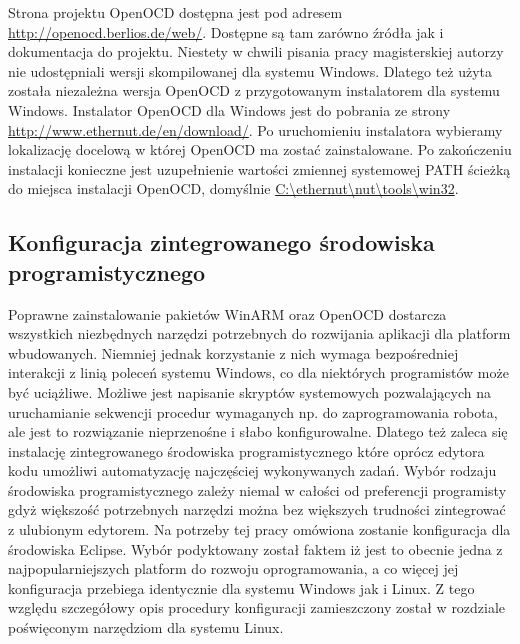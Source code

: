Strona projektu OpenOCD dostępna jest pod adresem
\url{http://openocd.berlios.de/web/}. Dostępne są tam zarówno źródła jak i
dokumentacja do projektu. Niestety w chwili pisania pracy magisterskiej autorzy
nie udostępniali wersji skompilowanej dla systemu Windows. Dlatego też użyta
została niezależna wersja OpenOCD z przygotowanym instalatorem dla systemu
Windows. Instalator OpenOCD dla Windows jest do pobrania ze strony
\url{http://www.ethernut.de/en/download/}. Po uruchomieniu instalatora wybieramy
lokalizację docelową w której OpenOCD ma zostać zainstalowane. Po zakończeniu
instalacji konieczne jest uzupełnienie wartości zmiennej systemowej PATH ścieżką
do miejsca instalacji OpenOCD, domyślnie \url{C:\ethernut\nut\tools\win32}.

\subsection{Konfiguracja zintegrowanego środowiska programistycznego}
Poprawne zainstalowanie pakietów WinARM oraz OpenOCD dostarcza wszystkich
niezbędnych narzędzi potrzebnych do rozwijania aplikacji dla platform
wbudowanych. Niemniej jednak korzystanie z nich wymaga bezpośredniej interakcji
z linią poleceń systemu Windows, co dla niektórych programistów może być
uciążliwe. Możliwe jest napisanie skryptów systemowych pozwalających na
uruchamianie sekwencji procedur wymaganych np. do zaprogramowania robota,
ale jest to rozwiązanie nieprzenośne i słabo konfigurowalne. Dlatego też zaleca
się instalację zintegrowanego środowiska programistycznego które oprócz edytora
kodu umożliwi automatyzację najczęściej wykonywanych zadań. Wybór rodzaju
środowiska programistycznego zależy niemal w całości od preferencji programisty
gdyż większość potrzebnych narzędzi można bez większych trudności zintegrować z
ulubionym edytorem. Na potrzeby tej pracy omówiona zostanie konfiguracja dla
środowiska Eclipse. Wybór podyktowany został faktem iż jest to obecnie jedna z
najpopularniejszych platform do rozwoju oprogramowania, a co więcej jej
konfiguracja przebiega identycznie dla systemu Windows jak i Linux. Z tego
względu szczegółowy opis procedury konfiguracji zamieszczony został w rozdziale
poświęconym narzędziom dla systemu Linux.
